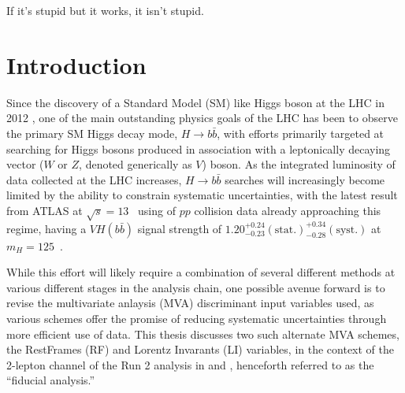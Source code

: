 \begin{savequote}[75mm]
If it's stupid but it works, it isn't stupid.
\end{savequote}

\chapter{Introduction}

Since the discovery of a Standard Model (SM) like Higgs boson at the LHC in 2012 \cite{:2012gk}, one of the main outstanding physics goals of the LHC has been to observe the primary SM Higgs decay mode, $H\to b\bar{b}$, with efforts primarily targeted at searching for Higgs bosons produced in association with a leptonically decaying vector ($W$ or $Z$, denoted generically as $V$) boson.  As the integrated luminosity of data collected at the LHC increases, $H\to b\bar{b}$ searches will increasingly become limited by the ability to constrain systematic uncertainties, with the latest result from ATLAS at $\sqrt{s}=13$ \TeV\, using \LUMI of $pp$ collision data already approaching this regime, having a $VH\left(b\bar{b}\right)$ signal strength of $1.20^{+0.24}_{-0.23}(\textrm{stat.})^{+0.34}_{-0.28}(\textrm{syst.})$ at $m_{H}=125$ \GeV\,\cite{supportnote}.

While this effort will likely require a combination of several different methods at various different stages in the analysis chain, one possible avenue forward is to revise the multivariate anlaysis (MVA) discriminant input variables used, as various schemes offer the promise of reducing systematic uncertainties through more efficient use of data.  This thesis discusses two such alternate MVA schemes, the RestFrames (RF) and Lorentz Invarants (LI) variables, in the context of the 2-lepton channel of the Run 2 analysis in \cite{paper} and \cite{supportnote}, henceforth referred to as the ``fiducial analysis.''



